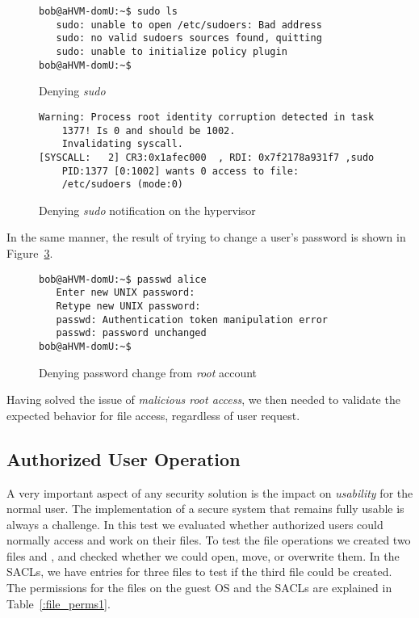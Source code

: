 \begin{figure}[ht]
	\centering
	\footnotesize{\selectfont 
		\begin{lstlisting}
bob@aHVM-domU:~$ sudo ls
   sudo: unable to open /etc/sudoers: Bad address
   sudo: no valid sudoers sources found, quitting
   sudo: unable to initialize policy plugin
bob@aHVM-domU:~$
		\end{lstlisting}}
	\caption{Denying \emph{sudo}}
	\label{fig:sudo_deny}
\end{figure}

\begin{figure}[ht]
	\centering
	\footnotesize{\selectfont 
		\begin{lstlisting}
Warning: Process root identity corruption detected in task 
	1377! Is 0 and should be 1002. 
	Invalidating syscall.
[SYSCALL:   2] CR3:0x1afec000  , RDI: 0x7f2178a931f7 ,sudo 
	PID:1377 [0:1002] wants 0 access to file: 
	/etc/sudoers (mode:0)
		\end{lstlisting}}
	\caption{Denying \emph{sudo} notification on the hypervisor}
	\label{fig:sudo_deny_not}
\end{figure}

\par In the same manner, the result of trying to change a user's password is shown in Figure~\ref{fig:passwd_deny}.

\begin{figure}[ht]
	\centering
	\footnotesize{\selectfont 
		\begin{lstlisting}
bob@aHVM-domU:~$ passwd alice
   Enter new UNIX password:
   Retype new UNIX password:
   passwd: Authentication token manipulation error
   passwd: password unchanged
bob@aHVM-domU:~$
		\end{lstlisting}}
	\caption{Denying password change from \emph{root} account}
	\label{fig:passwd_deny}
\end{figure}


\par Having solved the issue of \emph{malicious root access}, we then needed to validate the expected behavior for file access, regardless of  user request.

\subsection{Authorized User Operation}

\par A very important aspect of any security solution is the impact on \emph{usability} for the normal user. The implementation of a secure system that remains fully usable is always a challenge. In this test we evaluated whether authorized users could normally access and work on their files. To test the file operations we created two files  and , and checked whether we could open, move, or overwrite them. In the \acp{SACL}, we have entries for three files to test if the third file could be created. The permissions for the files on the guest \ac{OS} and the \acp{SACL} are explained in Table~\ref{:file_perms1}.

